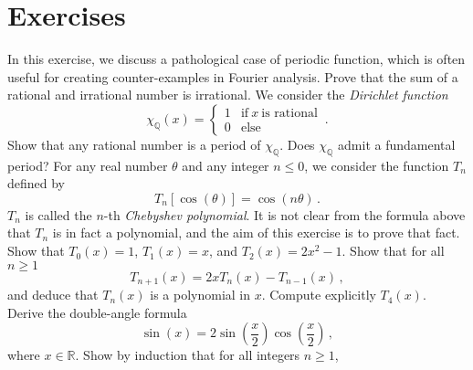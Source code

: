 \section{Exercises}
\begin{ExerciseList}
  \Exercise[label=dirichletfn]
  In this exercise, we discuss a pathological case of periodic function, which is often
  useful for creating counter-examples in Fourier analysis.
  \Question Prove that the sum of a rational and irrational number is irrational.
  \Question We consider the \emph{Dirichlet function}
  \begin{equation}
    \chi_{\mathbb{Q}}(x)=
    \begin{cases}
      1 & \text{if}~x~\text{is rational}\\
      0 & \text{else}
    \end{cases}\,.
  \end{equation}
  Show that any rational number is a period of $\chi_{\mathbb{Q}}$.
  \Question Does $\chi_{\mathbb{Q}}$ admit a fundamental period?
  \Exercise[label=chebyshev]
  For any real number $\theta$ and any integer $n\leq 0$, we consider the function $T_n$ defined by
  \begin{equation}
    T_n[\cos(\theta)]=\cos(n\theta)\,.
  \end{equation}
  $T_n$ is called the $n$-th \emph{Chebyshev polynomial}. It is not clear from the formula
  above that $T_n$ is in fact a polynomial, and the aim of this exercise is to prove that fact.
  \Question Show that $T_0(x)=1$, $T_1(x)=x$, and $T_2(x)=2x^2-1$.
  \Question Show that for all $n\geq 1$
  \begin{equation}
    T_{n+1}(x)=2x T_n(x)-T_{n-1}(x)\,,
  \end{equation}
  and deduce that $T_n(x)$ is a polynomial in $x$.
  \Question Compute explicitly $T_4(x)$.
  \Exercise[label=viete]~
  \Question Derive the double-angle formula
  \begin{equation}
    \sin(x)=2\sin\left(\frac{x}{2}\right)\cos\left(\frac{x}{2}\right)\,,
  \end{equation}
  where $x\in\mathbb{R}$.
  \Question Show by induction that for all integers $n\geq 1$,

\end{ExerciseList}
